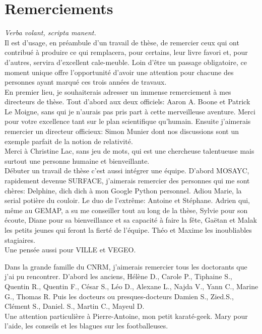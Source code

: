 \documentclass[a4paper,12pt,twoside]{StyleThese}
\begin{document}

\cleardoublepage
{}

\setcounter{page}{1}
\cleardoublepage
\chapter*{\selectfont Remerciements}

\textit{Verba volant, scripta manent.}\\


\noindent Il est d’usage, en préambule d’un travail de thèse, de remercier ceux qui ont contribué à produire ce qui remplacera, pour certains, leur livre favori et, pour d’autres, servira d’excellent cale-meuble. Loin d’être un passage obligatoire, ce moment unique offre l’opportunité d’avoir une attention pour chacune des personnes ayant marqué ces trois années de travaux.\\

\noindent En premier lieu, je souhaiterais adresser un immense remerciement à mes directeurs de thèse. Tout d’abord aux deux officiels: Aaron A. Boone et Patrick Le Moigne, sans qui je n’aurais pas pris part à cette merveilleuse aventure. Merci pour votre excellence tant sur le plan scientifique qu'humain.
\noindent Ensuite j’aimerais remercier un directeur officieux: Simon Munier dont nos discussions sont un exemple parfait de la notion de relativité.\\

\noindent Merci à Christine Lac, sans jeu de mots, qui est une chercheuse talentueuse mais surtout une personne humaine et bienveillante.\\

\noindent Débuter un travail de thèse c’est aussi intégrer une équipe. D’abord MOSAYC, rapidement devenue SURFACE, j’aimerais remercier des personnes qui me sont chères: 
Delphine, dich dich à mon Google Python personnel. Adiou Marie, la serial potière du couloir. Le duo de l’extrême: Antoine et Stéphane. Adrien qui, même au GEMAP, a su me conseiller tout au long de la thèse, Sylvie pour son écoute, Diane pour sa bienveillance et sa capacité à faire la fête, Gaëtan et Malak les petits jeunes qui feront la fierté de l’équipe. Théo et Maxime les inoubliables stagiaires.\\
Une pensée aussi pour VILLE et VEGEO.

\noindent Dans la grande famille du CNRM, j’aimerais remercier tous les doctorants que j’ai pu rencontrer. D’abord les anciens, Hélène D., Carole P., Tiphaine S., Quentin R., Quentin F., César S., Léo D., Alexane L., Najda V., Yann C., Marine G., Thomas R. Puis les docteurs ou presques-docteurs Damien S., Zied.S., Clément S., Daniel. S., Martin C., Mayeul D.\\
\noindent Une attention particulière à Pierre-Antoine, mon petit karaté-geek. Mary pour l’aide, les conseils et les blagues sur les footballeuses.\\
\end{document}
